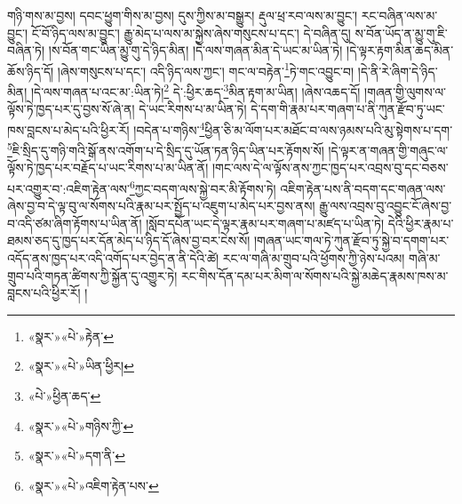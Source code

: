 གཉི་གས་མ་བྱས། དབང་ཕྱུག་གིས་མ་བྱས། དུས་ཀྱིས་མ་བསྒྱུར། རྡུལ་ཕྲ་རབ་ལས་མ་བྱུང་། རང་བཞིན་ལས་མ་བྱུང་། ངོ་བོ་ཉིད་ལས་མ་བྱུང་། རྒྱུ་མེད་པ་ལས་མ་སྐྱེས་ཞེས་གསུངས་པ་དང་། དེ་བཞིན་དུ། ས་བོན་ཡོད་ན་མྱུ་གུ་ཇི་བཞིན་ཏེ། །ས་བོན་གང་ཡིན་མྱུ་གུ་དེ་ཉིད་མིན། །དེ་ལས་གཞན་མིན་དེ་ཡང་མ་ཡིན་ཏེ། །དེ་ལྟར་རྟག་མིན་ཆད་མིན་ཆོས་ཉིད་དོ། །ཞེས་གསུངས་པ་དང་། འདི་ཉིད་ལས་ཀྱང་། གང་ལ་བརྟེན་\footnote{«སྣར་»«པེ་»རྟེན་}ཏེ་གང་འབྱུང་བ། །དེ་ནི་རེ་ཞིག་དེ་ཉིད་མིན། །དེ་ལས་གཞན་པ་འང་མ་:ཡིན་ཏེ།\footnote{«སྣར་»«པེ་»ཡིན་ཕྱིར།} དེ་:ཕྱིར་ཆད་\footnote{«པེ་»ཕྱིན་ཆད་}མིན་རྟག་མ་ཡིན། །ཞེས་འཆད་དོ། །གཞན་གྱི་ལུགས་ལ་ལྟོས་ཏེ་ཁྱད་པར་དུ་བྱས་སོ་ཞེ་ན། དེ་ཡང་རིགས་པ་མ་ཡིན་ཏེ། དེ་དག་གི་རྣམ་པར་གཞག་པ་ནི་ཀུན་རྫོབ་ཏུ་ཡང་ཁས་བླངས་པ་མེད་པའི་ཕྱིར་རོ། །བདེན་པ་གཉིས་\footnote{«སྣར་»«པེ་»གཉིས་ཀྱི་}ཕྱིན་ཅི་མ་ལོག་པར་མཐོང་བ་ལས་ཉམས་པའི་མུ་སྟེགས་པ་དག་\footnote{«སྣར་»«པེ་»དག་ནི་}ཇི་སྲིད་དུ་གཉི་གའི་སྒོ་ནས་འགོག་པ་དེ་སྲིད་དུ་ཡོན་ཏན་ཉིད་ཡིན་པར་རྟོགས་སོ། །དེ་ལྟར་ན་གཞན་གྱི་གཞུང་ལ་ལྟོས་ཏེ་ཁྱད་པར་བརྗོད་པ་ཡང་རིགས་པ་མ་ཡིན་ནོ། །གང་ལས་དེ་ལ་ལྟོས་ནས་ཀྱང་ཁྱད་པར་འབྲས་བུ་དང་བཅས་པར་འགྱུར་བ་:འཇིག་རྟེན་ལས་\footnote{«སྣར་»«པེ་»འཇིག་རྟེན་པས་}ཀྱང་བདག་ལས་སྐྱེ་བར་མི་རྟོགས་ཏེ། འཇིག་རྟེན་པས་ནི་བདག་དང་གཞན་ལས་ཞེས་བྱ་བ་དེ་ལྟ་བུ་ལ་སོགས་པའི་རྣམ་པར་སྤྱོད་པ་འཇུག་པ་མེད་པར་བྱས་ནས། རྒྱུ་ལས་འབྲས་བུ་འབྱུང་ངོ་ཞེས་བྱ་བ་འདི་ཙམ་ཞིག་རྟོགས་པ་ཡིན་ནོ། །སློབ་དཔོན་ཡང་དེ་ལྟར་རྣམ་པར་གཞག་པ་མཛད་པ་ཡིན་ཏེ། དེའི་ཕྱིར་རྣམ་པ་ཐམས་ཅད་དུ་ཁྱད་པར་དོན་མེད་པ་ཉིད་དོ་ཞེས་བྱ་བར་ངེས་སོ། །གཞན་ཡང་གལ་ཏེ་ཀུན་རྫོབ་ཏུ་སྐྱེ་བ་དགག་པར་འདོད་ནས་ཁྱད་པར་འདི་འགོད་པར་བྱེད་ན་ནི་དེའི་ཚེ། རང་ལ་གཞི་མ་གྲུབ་པའི་ཕྱོགས་ཀྱི་ཉེས་པའམ། གཞི་མ་གྲུབ་པའི་གཏན་ཚིགས་ཀྱི་སྐྱོན་དུ་འགྱུར་ཏེ། རང་གིས་དོན་དམ་པར་མིག་ལ་སོགས་པའི་སྐྱེ་མཆེད་རྣམས་ཁས་མ་བླངས་པའི་ཕྱིར་རོ། །
